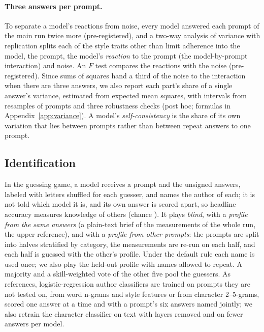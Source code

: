 \documentclass[11pt]{article}
\begin{document}
\paragraph{Three answers per prompt.}
To separate a model's reactions from noise, every model answered each prompt of the main run twice more (pre-registered), and a two-way analysis of variance with replication splits each of the \repNTraits{} style traits other than limit adherence into the model, the prompt, the model's \emph{reaction} to the prompt (the model-by-prompt interaction) and noise.
An $F$ test compares the reactions with the noise (pre-registered).
Since sums of squares hand a third of the noise to the interaction when there are three answers, we also report each part's share of a single answer's variance, estimated from expected mean squares, with intervals from \bootReps{} resamples of prompts and three robustness checks (post hoc; formulas in Appendix~\ref{app:variance}).
A model's \emph{self-consistency} is the share of its own variation that lies between prompts rather than between repeat answers to one prompt.

\subsection{Identification}
\label{sec:game-method}
In the guessing game, a model receives a prompt and the \nModels{} unsigned answers, labeled with letters shuffled for each guesser, and names the author of each; it is not told which model it is, and its own answer is scored apart, so headline accuracy measures knowledge of others (chance \chance).
It plays \emph{blind}, with a \emph{profile from the same answers} (a plain-text brief of the measurements of the whole run, the upper reference), and with a \emph{profile from other prompts}: the prompts are split into halves stratified by category, the measurements are re-run on each half, and each half is guessed with the other's profile.
Under the default rule each name is used once; we also play the held-out profile with names allowed to repeat.
A majority and a skill-weighted vote of the other five pool the guessers.
As references, logistic-regression author classifiers \citep{pedregosa2011sklearn} are trained on prompts they are not tested on, from word n-grams and style features or from character 2--5-grams, scored one answer at a time and with a prompt's six answers named jointly; we also retrain the character classifier on text with layers removed and on fewer answers per model.
\end{document}
